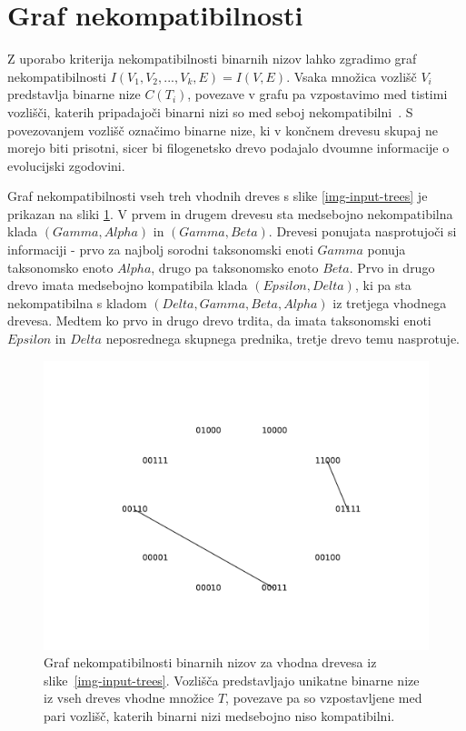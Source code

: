 \documentclass[a4paper, 12pt]{book}
\begin{document}
\section{Graf nekompatibilnosti}
Z uporabo kriterija nekompatibilnosti binarnih nizov lahko zgradimo graf 
nekompatibilnosti $I(V_1, V_2, ..., V_k, E) = I(V, E)$. Vsaka množica vozlišč 
$V_i$ predstavlja binarne nize $C(T_i)$, povezave v grafu pa vzpostavimo med 
tistimi vozlišči, katerih pripadajoči binarni nizi so med seboj 
nekompatibilni~\cite{pw}. S povezovanjem vozlišč označimo binarne nize, ki v 
končnem drevesu skupaj ne morejo biti prisotni, sicer bi filogenetsko drevo 
podajalo dvoumne informacije o evolucijski zgodovini. 

Graf nekompatibilnosti vseh treh vhodnih dreves s slike \ref{img-input-trees} 
je prikazan na sliki \ref{img-incompat-graph-example}. V prvem in drugem drevesu 
sta medsebojno nekompatibilna klada $(Gamma, Alpha)$ in $(Gamma, Beta)$. Drevesi 
ponujata nasprotujoči si informaciji - prvo za najbolj sorodni taksonomski 
enoti $Gamma$ ponuja taksonomsko enoto $Alpha$, drugo pa taksonomsko enoto $Beta$. 
Prvo in drugo drevo imata medsebojno kompatibila klada $(Epsilon, Delta)$, ki pa 
sta nekompatibilna s kladom $(Delta, Gamma, Beta, Alpha)$ iz tretjega vhodnega 
drevesa. Medtem ko prvo in drugo drevo trdita, da imata taksonomski enoti 
$Epsilon$ in $Delta$ neposrednega skupnega prednika, tretje drevo temu nasprotuje.

\begin{figure}
	\begin{center}
		\includegraphics[scale=0.7, clip=true, trim=2cm 2cm 2cm 2cm]{gfx/incompat_graph.pdf}
	\end{center}
	\caption{
		Graf nekompatibilnosti binarnih nizov za vhodna drevesa iz 
		slike~\ref{img-input-trees}. Vozlišča predstavljajo unikatne binarne 
		nize iz vseh dreves vhodne množice $T$, povezave pa so vzpostavljene 
		med pari vozlišč, katerih binarni nizi medsebojno niso kompatibilni.
	}
	\label{img-incompat-graph-example}
\end{figure}
\end{document}
